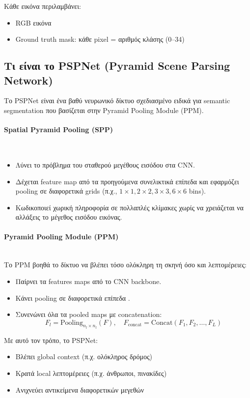 \documentclass[12pt]{article}
\begin{document}
    Κάθε εικόνα περιλαμβάνει:
    \begin{itemize}
        \item RGB εικόνα
        \item Ground truth mask: κάθε pixel = αριθμός κλάσης (0–34)
    \end{itemize}
    
    \subsection{Τι είναι το PSPNet (Pyramid Scene Parsing Network)}
    Το PSPNet είναι ένα βαθύ νευρωνικό δίκτυο σχεδιασμένο ειδικά για semantic segmentation που βασίζεται στην Pyramid Pooling Module (PPM).
    \paragraph{Spatial Pyramid Pooling (SPP)}
    \mbox{}\\
    \begin{itemize}
        \item Λύνει το πρόβλημα του σταθερού μεγέθους εισόδου στα CNN.
        \item Δέχεται feature map από τα προηγούμενα συνελικτικά επίπεδα και εφαρμόζει pooling σε διαφορετικά grids (π.χ., \(1\times1, 2\times2, 3\times3, 6\times6\) bins).
        \item Κωδικοποιεί χωρική πληροφορία σε πολλαπλές κλίμακες χωρίς να χρειάζεται να αλλάξεις το μέγεθος εισόδου εικόνας.
    \end{itemize}
    
    \paragraph{Pyramid Pooling Module (PPM)}
    \mbox{}\\
    Το PPM βοηθά το δίκτυο να βλέπει τόσο ολόκληρη τη σκηνή όσο και λεπτομέρειες:
    \begin{itemize}
        \item Παίρνει τα features maps από το CNN backbone.
        \item Κάνει pooling σε διαφορετικά επίπεδα .
        \item Συνενώνει όλα τα pooled maps με concatenation:
        \[
        F_l = \text{Pooling}_{n_l \times n_l}(F), \quad F_\text{concat} = \text{Concat}(F_1, F_2, \dots, F_L)
        \]
    \end{itemize}
    
    Με αυτό τον τρόπο, το PSPNet:
    \begin{itemize}
        \item Βλέπει global context (π.χ. ολόκληρος δρόμος)
        \item Κρατά local λεπτομέρειες (π.χ. άνθρωποι, πινακίδες)
        \item Ανιχνεύει αντικείμενα διαφορετικών μεγεθών
    \end{itemize}
    
\end{document}
